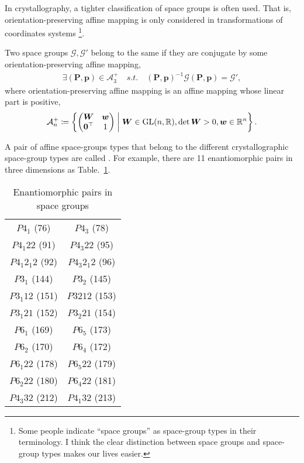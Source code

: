 In crystallography, a tighter classification of space groups is often used.
That is, orientation-preserving affine mapping is only considered in transformations of coordinates systems \footnote{
  Some people indicate ``space groups'' as space-group types in their terminology.
  I think the clear distinction between space groups and space-group types makes our lives easier.
}.

\begin{screen}
  \begin{definition}
    Two space groups $\mathcal{G}, \mathcal{G}'$ belong to the same  if they are conjugate by some orientation-preserving affine mapping,
    \begin{align}
      \exists (\bm{P}, \bm{p}) \in \mathcal{A}^{+}_{3} \quad s.t. \quad (\bm{P}, \bm{p})^{-1} \mathcal{G} (\bm{P}, \bm{p}) = \mathcal{G}',
    \end{align}
    where orientation-preserving affine mapping is an affine mapping whose linear part is positive,
    \begin{align}
      \mathcal{A}^{+}_{n} \coloneqq \left\{  \begin{pmatrix} \bm{W} & \bm{w} \\ \bm{0}^{\top} & 1 \end{pmatrix}  \mathrel{}\middle|\mathrel{}  \bm{W} \in \mathrm{GL}(n, \mathbb{R}), \det \bm{W} > 0, \bm{w} \in \mathbb{R}^{n}  \right\}.
    \end{align}
  \end{definition}
\end{screen}

A pair of affine space-groups types that belong to the different crystallographic space-group types are called .
For example, there are 11 enantiomorphic pairs in three dimensions as Table.~\ref{table:enantiomorphic-pairs-3d}.

\begin{table}[tb]
  \centering
  \caption{Enantiomorphic pairs in space groups}
  \label{table:enantiomorphic-pairs-3d}
  \begin{tabular}[h]{cc}
    $P 4_{1}$ (76)         & $P 4_{3}$ (78) \\
    $P 4_{1} 2 2$ (91)     & $P 4_{3} 2 2$ (95) \\
    $P 4_{1} 2_{1} 2$ (92) & $P 4_{3} 2_{1} 2$ (96) \\
    $P 3_{1}$ (144)        & $P 3_{2}$ (145) \\
    $P 3_{1} 1 2$ (151)    & $P 3{2} 1 2$ (153) \\
    $P 3_{1} 2 1$ (152)    & $P 3_{2} 2 1$ (154) \\
    $P 6_{1}$ (169)        & $P 6_{5}$ (173) \\
    $P 6_{2}$ (170)        & $P 6_{4}$ (172) \\
    $P 6_{1} 2 2$ (178)    & $P 6_{5} 2 2$ (179) \\
    $P 6_{2} 2 2$ (180)    & $P 6_{4} 2 2$ (181) \\
    $P 4_{3} 3 2$ (212)    & $P 4_{1} 3 2$ (213)
  \end{tabular}
\end{table}

